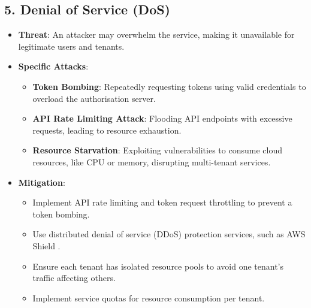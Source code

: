 \subsection*{5. Denial of Service (DoS)}
\begin{itemize}
    \item \textbf{Threat}: An attacker may overwhelm the service, making it unavailable for legitimate users and tenants.
    \item \textbf{Specific Attacks}:
    \begin{itemize}
        \item \textbf{Token Bombing}: Repeatedly requesting tokens using valid credentials to overload the authorisation server.
        \item \textbf{API Rate Limiting Attack}: Flooding API endpoints with excessive requests, leading to resource exhaustion.
        \item \textbf{Resource Starvation}: Exploiting vulnerabilities to consume cloud resources, like CPU or memory, disrupting multi-tenant services.
    \end{itemize}
    \item \textbf{Mitigation}:
    \begin{itemize}
        \item Implement API rate limiting and token request throttling to prevent a token bombing.
        \item Use distributed denial of service (DDoS) protection services, such as AWS Shield \citep{aws_shield}.
        \item Ensure each tenant has isolated resource pools to avoid one tenant's traffic affecting others.
        \item Implement service quotas for resource consumption per tenant.
    \end{itemize}
\end{itemize}

